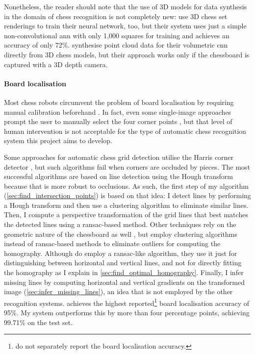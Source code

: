 \documentclass[../report.tex]{subfiles}
\begin{document}
Nonetheless, the reader should note that the use of 3D models for data synthesis in the domain of chess recognition is not completely new:
\textcite{hou} use 3D chess set renderings to train their neural network, too, but their system uses just a simple non-convolutional \gls{ann} with only 1,000 squares for training and achieves an accuracy of only 72\%.
\textcite{wei2017} synthesise point cloud data for their volumetric \gls{cnn} directly from 3D chess models, but their approach works only if the chessboard is captured with a 3D depth camera.

\paragraph{Board localisation}
Most chess robots circumvent the problem of board localisation by requiring manual calibration beforehand \cite{goncalves2005,sokic2008,khan2014}.
In fact, even some single-image approaches prompt the user to manually select the four corner points \cite{danner2015}, but that level of human intervention is not acceptable for the type of automatic chess recognition system this project aims to develop.

Some approaches for automatic chess grid detection utilise the Harris corner detector \cite{banerjee2012,hack2014}, but such algorithms fail when corners are occluded by pieces.
The most successful algorithms are based on line detection using the Hough transform \cite{tam2008,neufeld2010,danner2015,chen2016,kanchibail2016,xie2018a,chen2019} because that is more robust to occlusions.
As such, the first step of my algorithm (\cref{sec:find_intersection_points}) is based on that idea: I detect lines by performing a Hough transform and then use a clustering algorithm to eliminate similar lines.
Then, I compute a perspective transformation of the grid lines that best matches the detected lines using a \gls{ransac}-based method.
Other techniques rely on the geometric nature of the chessboard as well \cite{tam2008,hack2014,danner2015,xie2018}, but employ clustering algorithms instead of \gls{ransac}-based methods to eliminate outliers for computing the homography.
Although \textcite{hack2014} do employ a \gls{ransac}-like algorithm, they use it just for distinguishing between horizontal and vertical lines, and not for directly fitting the homography as I explain in \cref{sec:find_optimal_homography}.
Finally, I infer missing lines by computing horizontal and vertical gradients on the transformed image (\cref{sec:infer_missing_lines}), an idea that is not employed by the other recognition systems.
\Textcite{czyzewski2020} achieves the highest reported\footnote{ do not separately report the board localisation accuracy.} board localisation accuracy of 95\%.
My system outperforms this by more than four percentage points, achieving 99.71\% on the test set.
\end{document}
